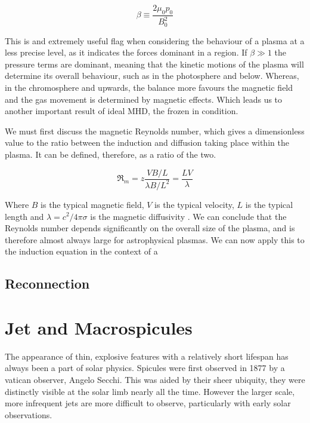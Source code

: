 \begin{equation}
	\beta \equiv \frac{2\mu_0p_0}{B_0^2}
\end{equation} 

This is and extremely useful flag when considering the behaviour of a plasma at a less precise level, as it indicates the forces dominant in a region.
If $\beta \gg 1$ the pressure terms are dominant, meaning that the kinetic motions of the plasma will determine its overall behaviour, such as in the photosphere and below.
Whereas, in the chromosphere and upwards, the balance more favours the magnetic field and the gas movement is determined by magnetic effects.
Which leads us to another important result of ideal MHD, the frozen in condition.

We must first discuss the magnetic Reynolds number, which gives a dimensionless value to the ratio between the induction and diffusion taking place within the plasma.
It can be defined, therefore, as a ratio of the two.

\begin{equation}
	\Re_m = z\frac{VB/L}{\lambda B/L^2} = \frac{LV}{\lambda} 
\end{equation}

Where $B$ is the typical magnetic field, $V$ is the typical velocity, $L$ is the typical length and $\lambda = c^2/{4\pi\sigma}$ is the magnetic diffusivity \citep{Choudhuri1998}.
We can conclude that the Reynolds number depends significantly on the overall size of the plasma, and is therefore almost always large for astrophysical plasmas.
We can now apply this to the induction equation in the context of a 







\subsection{Reconnection}

\section{Jet and Macrospicules}

The appearance of thin, explosive features with a relatively short lifespan has always been a part of solar physics.
Spicules were first observed in 1877 by a vatican observer, Angelo Secchi.
This was aided by their sheer ubiquity, they were distinctly visible at the solar limb nearly all the time.
However the larger scale, more infrequent jets are more difficult to observe, particularly with early solar observations.

